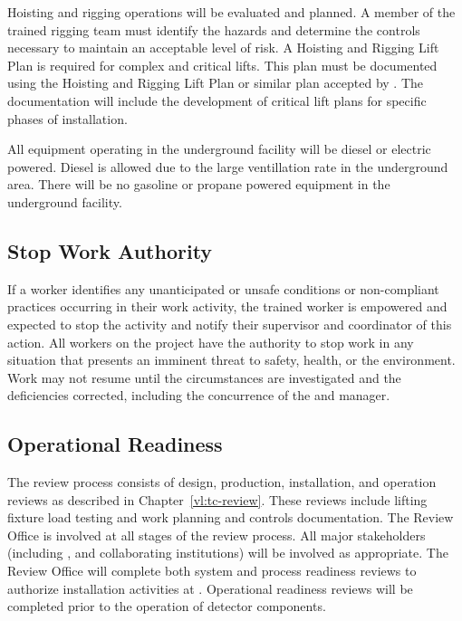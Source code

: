 Hoisting and rigging operations will be evaluated and planned.  A
member of the trained rigging team must identify the hazards and
determine the controls necessary to maintain an acceptable level of
risk.  A Hoisting and Rigging Lift Plan is required for complex and
critical lifts. This plan must be documented using the \fnal Hoisting
and Rigging Lift Plan or similar plan accepted by \fnal. The 
 documentation will include the development of critical lift
plans for specific phases of installation. %

All equipment operating in the underground facility will be diesel or
electric powered. Diesel is allowed due to the large
ventillation rate in the underground area.  There will be no gasoline or propane powered
equipment in the underground facility.

\subsection{Stop Work Authority}

If a worker identifies any unanticipated or unsafe conditions %
or non-compliant
practices occurring in their work activity, %
the trained worker is empowered and expected to stop the activity
 and notify their supervisor and   coordinator of
this action. All workers on the  project have the
authority to stop work in any situation that presents an imminent
threat to safety, health, or the environment. Work may not resume
until the circumstances are investigated and the deficiencies corrected,
including the concurrence of the  
and   manager.


\subsection{Operational Readiness}

The  review process consists of design, production,
installation, and operation reviews as described in
Chapter~\ref{vl:tc-review}. These reviews include lifting fixture
load testing and work planning and controls documentation. The
 Review Office is involved at all stages of the review
process. All major stakeholders (including ,  and
 collaborating institutions) will be involved as
appropriate. The Review Office will complete both system and process
readiness reviews to authorize installation activities at
.  Operational readiness reviews will be completed prior
 to the operation of detector components.

